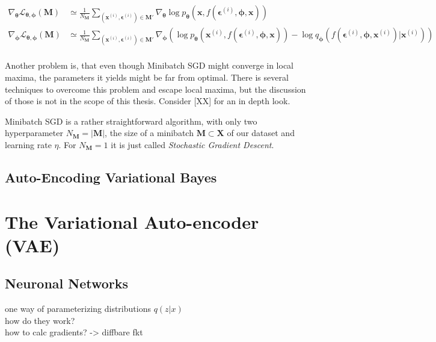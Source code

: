 \documentclass[12pt]{report}
\begin{document}
\begin{equation}
\begin{split}
	\nabla_{\pmb{\theta}}\mathcal{L}_{\pmb{\theta}, \pmb{\phi}}(\mathbf{M}) 
	& \simeq \frac{1}{N_{\mathbf{M}}} \sum_{(\mathbf{x}^{(i)}, \pmb{\epsilon}^{(i)}) \in \mathbf{M}'} \nabla_{\pmb{\theta}} \log p_{\mathbf{\theta}}(\mathbf{x}, f(\pmb{\epsilon}^{(i)}, \pmb{\phi}, \mathbf{x})) \\
	\nabla_{\pmb{\phi}}\mathcal{L}_{\pmb{\theta}, \pmb{\phi}}(\mathbf{M}) 
	& \simeq \frac{1}{N_{\mathbf{M}}} \sum_{(\mathbf{x}^{(i)}, \pmb{\epsilon}^{(i)}) \in \mathbf{M}'} \nabla_{\pmb{\phi}}(\log p_{\mathbf{\theta}}(\mathbf{x}^{(i)}, f(\pmb{\epsilon}^{(i)}, \pmb{\phi}, \mathbf{x})) - \log q_{\mathbf{\phi}}(f(\pmb{\epsilon}^{(i)}, \pmb{\phi}, \mathbf{x}^{(i)})|\mathbf{x}^{(i)}))  \\
\end{split}
\end{equation}



Another problem is, that even though Minibatch SGD might converge in local maxima, the parameters it yields might be far from optimal. There is several techniques to overcome this problem and escape local maxima, but the discussion of those is not in the scope of this thesis. Consider [XX] for an in depth look.

Minibatch SGD is a rather straightforward algorithm, with only two hyperparameter $N_\mathbf{M} = | \mathbf{M} | $, the size of a minibatch $\mathbf{M} \subset \mathbf{X}$ of our dataset and learning rate $\eta$. For $N_{\mathbf{M}}=1$ it is just called \emph{Stochastic Gradient Descent}.


\subsection{Auto-Encoding Variational Bayes}

\section{The Variational Auto-encoder (VAE)}
\subsection{Neuronal Networks}
one way of parameterizing distributions $q(z|x)$ \\
how do they work? \\
how to calc gradients? -> diffbare fkt\\
\end{document}
